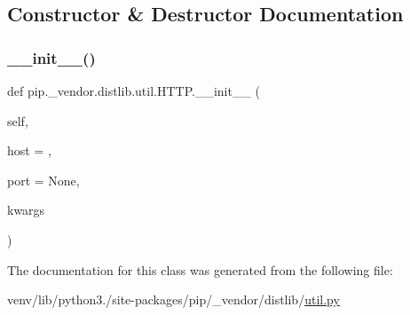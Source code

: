 \subsection{Constructor \& Destructor Documentation}
\mbox{\label{classpip_1_1__vendor_1_1distlib_1_1util_1_1HTTP_a3021c8c75b74eff330883ac16eaf02be}} 
\subsubsection{\texorpdfstring{\+\_\+\+\_\+init\+\_\+\+\_\+()}{\_\_init\_\_()}}
{\footnotesize\ttfamily def pip.\+\_\+vendor.\+distlib.\+util.\+H\+T\+T\+P.\+\_\+\+\_\+init\+\_\+\+\_\+ (\begin{DoxyParamCaption}\item[{}]{self,  }\item[{}]{host = {\ttfamily \textquotesingle{}\textquotesingle{}},  }\item[{}]{port = {\ttfamily None},  }\item[{}]{kwargs }\end{DoxyParamCaption})}



The documentation for this class was generated from the following file\+:\begin{DoxyCompactItemize}
\item 
venv/lib/python3./site-\/packages/pip/\+\_\+vendor/distlib/\hyperlink{pip_2__vendor_2distlib_2util_8py}{util.\+py}\end{DoxyCompactItemize}
